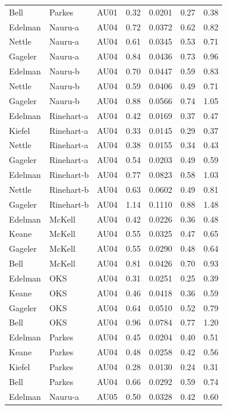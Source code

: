\documentclass{monashthesis}
\begin{document}
\begin{center}
\begin{longtable}{lllllll}
Bell & Parkes & AU01 & 0.32 & 0.0201 & 0.27 & 0.38 \\
Edelman & Nauru-a & AU04 & 0.72 & 0.0372 & 0.62 & 0.82 \\
Nettle & Nauru-a & AU04 & 0.61 & 0.0345 & 0.53 & 0.71 \\
Gageler & Nauru-a & AU04 & 0.84 & 0.0436 & 0.73 & 0.96 \\
Edelman & Nauru-b & AU04 & 0.70 & 0.0447 & 0.59 & 0.83 \\
Nettle & Nauru-b & AU04 & 0.59 & 0.0406 & 0.49 & 0.71 \\
Gageler & Nauru-b & AU04 & 0.88 & 0.0566 & 0.74 & 1.05 \\
Edelman & Rinehart-a & AU04 & 0.42 & 0.0169 & 0.37 & 0.47 \\
Kiefel & Rinehart-a & AU04 & 0.33 & 0.0145 & 0.29 & 0.37 \\
Nettle & Rinehart-a & AU04 & 0.38 & 0.0155 & 0.34 & 0.43 \\
Gageler & Rinehart-a & AU04 & 0.54 & 0.0203 & 0.49 & 0.59 \\
Edelman & Rinehart-b & AU04 & 0.77 & 0.0823 & 0.58 & 1.03 \\
Nettle & Rinehart-b & AU04 & 0.63 & 0.0602 & 0.49 & 0.81 \\
Gageler & Rinehart-b & AU04 & 1.14 & 0.1110 & 0.88 & 1.48 \\
Edelman & McKell & AU04 & 0.42 & 0.0226 & 0.36 & 0.48 \\
Keane & McKell & AU04 & 0.55 & 0.0325 & 0.47 & 0.65 \\
Gageler & McKell & AU04 & 0.55 & 0.0290 & 0.48 & 0.64 \\
Bell & McKell & AU04 & 0.81 & 0.0426 & 0.70 & 0.93 \\
Edelman & OKS & AU04 & 0.31 & 0.0251 & 0.25 & 0.39 \\
Keane & OKS & AU04 & 0.46 & 0.0418 & 0.36 & 0.59 \\
Gageler & OKS & AU04 & 0.64 & 0.0510 & 0.52 & 0.79 \\
Bell & OKS & AU04 & 0.96 & 0.0784 & 0.77 & 1.20 \\
Edelman & Parkes & AU04 & 0.45 & 0.0204 & 0.40 & 0.51 \\
Keane & Parkes & AU04 & 0.48 & 0.0258 & 0.42 & 0.56 \\
Kiefel & Parkes & AU04 & 0.28 & 0.0130 & 0.24 & 0.31 \\
Bell & Parkes & AU04 & 0.66 & 0.0292 & 0.59 & 0.74 \\
Edelman & Nauru-a & AU05 & 0.50 & 0.0328 & 0.42 & 0.60 \\

\end{longtable}
\end{center}
\end{document}
